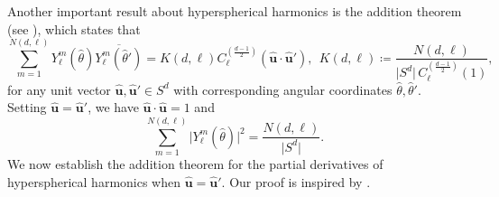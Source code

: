 \documentclass[11pt]{amsart}
\theoremstyle{definition}
\theoremstyle{plain}
\theoremstyle{remark}
\renewcommand{\vec}[1]{\hat{\boldsymbol{#1}}}
\newcommand{\abs}[1]{\lvert{#1}\rvert}
\newcommand{\cc}{\overline}
\begin{document}
Another important result about hyperspherical harmonics is the addition theorem (see \cite[Eq.~51]{wen1985}), which states that 
\begin{equation} \label{eq:SH_addition}
\sum_{m = 1}^{N(d, \ell)} Y_\ell^m(\hat\theta)\cc{Y_\ell^m(\hat\theta')} = K(d, \ell)C_\ell^{\left(\frac{d - 1}{2}\right)}(\vec{u}\cdot\vec{u}'), \ \ K(d, \ell)\coloneqq \frac{N(d, \ell)}{\abs{S^d}\, C_\ell^{\left(\frac{d - 1}{2}\right)}(1)}, 
\end{equation} 
for any unit vector $\vec{u}, \vec{u}'\in S^d$ with corresponding angular coordinates $\hat\theta, \hat\theta'$. Setting $\vec{u} = \vec{u}'$, we have $\vec{u}\cdot\vec{u} = 1$ and 
\begin{equation} \label{eq:SH_addition_same} 
\sum_{m = 1}^{N(d, \ell)} \abs{Y_\ell^m(\hat\theta)}^2 = \frac{N(d, \ell)}{\abs{S^d}}. 
\end{equation} 
We now establish the addition theorem for the partial derivatives of hyperspherical harmonics when $\vec{u} = \vec{u}'$. Our proof is inspired by \cite{winch1995}. 
\end{document}
